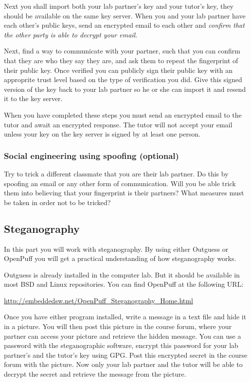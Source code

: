 \documentclass[a4paper]{llncs}
\begin{document}
Next you shall import both your lab partner's key and your tutor's key, they
should be available on the same key server.
When you and your lab partner have each other's public keys, send an encrypted
email to each other and \emph{confirm that the other party is able to decrypt 
your email}.

Next, find a way to communicate with your partner, such that you can
confirm that they are who they say they are, and ask them to repeat the 
fingerprint of their public key.
Once verified you can publicly sign their public key with an approprite trust 
level based on the type of verification you did.
Give this signed version of the key back to your lab partner so he or she can 
import it and resend it to the key server.

When you have completed these steps you must send an encrypted email to the 
tutor and await an encrypted response.
The tutor will not accept your email unless your key on the key server is 
signed by at least one person.

\subsubsection{Social engineering using spoofing (optional)}
\label{subsec:Social}
Try to trick a different classmate that you are their lab partner.
Do this by spoofing an email or any other form of communication.
Will you be able trick them into believing that your fingerprint is their 
partners?
What measures must be taken in order not to be tricked?

\subsection{Steganography}
\label{subsec:Steganograhy}
In this part you will work with steganography.
By using either Outguess or OpenPuff you will get a practical understanding of 
how steganography works. 

Outguess is already installed in the computer lab.
But it should be available in most BSD and Linux repositories.
You can find OpenPuff at the following URL\@:
\begin{center}
  \url{http://embeddedsw.net/OpenPuff_Steganography_Home.html}
\end{center}

Once you have either program installed, write a message in a text file and hide 
it in a picture.
You will then post this picture in the course forum, where your partner can
access your picture and retrieve the hidden message.
You can use a password with the steganographic software, encrypt this password 
for your lab partner's and the tutor's key using GPG\@.
Post this encrypted secret in the course forum with the picture.
Now only your lab partner and the tutor will be able to decrypt the secret and 
retrieve the message from the picture.
\end{document}
